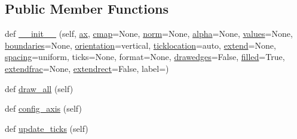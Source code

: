 \subsection*{Public Member Functions}
\begin{DoxyCompactItemize}
\item 
def \hyperlink{classmatplotlib_1_1colorbar_1_1ColorbarBase_ab4493c997fc4ccbdf0a5ef431c2c4324}{\+\_\+\+\_\+init\+\_\+\+\_\+} (self, \hyperlink{classmatplotlib_1_1colorbar_1_1ColorbarBase_a7c7242b00d002cd407d5068a8755afe2}{ax}, \hyperlink{classmatplotlib_1_1colorbar_1_1ColorbarBase_a29c38d3fc56ca3a206de583c53823531}{cmap}=None, \hyperlink{classmatplotlib_1_1colorbar_1_1ColorbarBase_a3e823e99ebe4731a0b57c434db8d27e7}{norm}=None, \hyperlink{classmatplotlib_1_1colorbar_1_1ColorbarBase_a1079da131721a9ca9b6241ad638e9b5a}{alpha}=None, \hyperlink{classmatplotlib_1_1colorbar_1_1ColorbarBase_a235aac27fe5881fd7cc1ba8fe9b8f9d4}{values}=None, \hyperlink{classmatplotlib_1_1colorbar_1_1ColorbarBase_ab4910522dfa4129aee92fb94a5c6e383}{boundaries}=None, \hyperlink{classmatplotlib_1_1colorbar_1_1ColorbarBase_aeada0bef54f820328cc4f35f5166556c}{orientation}=\textquotesingle{}vertical\textquotesingle{}, \hyperlink{classmatplotlib_1_1colorbar_1_1ColorbarBase_aaac704b6706e3d47e4697ddcfe03e54e}{ticklocation}=\textquotesingle{}auto\textquotesingle{}, \hyperlink{classmatplotlib_1_1colorbar_1_1ColorbarBase_a90a591d1dfc483e5a2f0cc0c0af8bab9}{extend}=None, \hyperlink{classmatplotlib_1_1colorbar_1_1ColorbarBase_a47e85d3cfa96f2e433b120f161f24e58}{spacing}=\textquotesingle{}uniform\textquotesingle{}, ticks=None, format=None, \hyperlink{classmatplotlib_1_1colorbar_1_1ColorbarBase_a66d12baa5b73d267c8e3525d31906697}{drawedges}=False, \hyperlink{classmatplotlib_1_1colorbar_1_1ColorbarBase_ab81e23a7d5384a0dce5665d3276dcf51}{filled}=True, \hyperlink{classmatplotlib_1_1colorbar_1_1ColorbarBase_a8e16f5fb3405c95acb78af865414fac4}{extendfrac}=None, \hyperlink{classmatplotlib_1_1colorbar_1_1ColorbarBase_a81792a32b8d842c4ceda3c14889f6769}{extendrect}=False, label=\textquotesingle{}\textquotesingle{})
\item 
def \hyperlink{classmatplotlib_1_1colorbar_1_1ColorbarBase_aeb435b03a1d0130b1a62c6fd67a68d89}{draw\+\_\+all} (self)
\item 
def \hyperlink{classmatplotlib_1_1colorbar_1_1ColorbarBase_a37c7063156e737af5d60cecd602fd55d}{config\+\_\+axis} (self)
\item 
def \hyperlink{classmatplotlib_1_1colorbar_1_1ColorbarBase_a06fc38a855f101d6ab40327b4033f6af}{update\+\_\+ticks} (self)
\item 

\end{DoxyCompactItemize}
